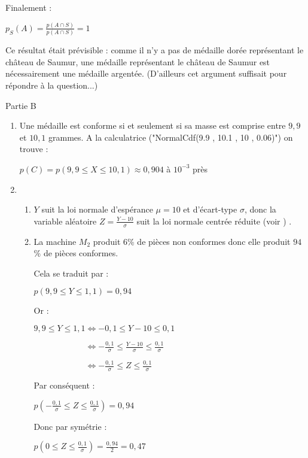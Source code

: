 \begin{corrige}
\begin{enumerate}
          \par
          Finalement :
          \par
          $p_S(A)=\frac{p(A \cap S)}{p(A \cap S)}=1$
          \par
          Ce résultat était prévisible : comme il n'y a pas de médaille dorée représentant le château de Saumur, une médaille représentant le château de Saumur est nécessairement une médaille argentée. (D'ailleurs cet argument suffisait pour répondre à la question...)
     \end{enumerate}
     \begin{h3}Partie B\end{h3}
     \begin{enumerate}
          \item
          Une médaille est conforme si et seulement si sa masse est comprise entre $9,9$ et $10,1$ grammes. A la calculatrice ("NormalCdf(9.9 , 10.1 , 10 , 0.06)") on trouve :
          \par
          $p(C)=p(9,9 \leqslant X \leqslant 10,1) \approx 0,904$ à $10^{-3}$ près
          \item
          \begin{enumerate}
               \item
               $Y$ suit la loi normale d'espérance $\mu = 10$ et d'écart-type $\sigma$, donc la variable aléatoire $Z=\frac{Y-10}{\sigma}$ suit la loi normale centrée réduite (voir ) .
               \item
               La machine $M_2$ produit $6$\% de pièces non conformes donc elle produit $94$\% de pièces conformes.
               \par
               Cela se traduit par :
               \par
               $p(9,9 \leqslant Y \leqslant 1,1)=0,94$
               \par
               Or :
               \par
               $9,9 \leqslant Y \leqslant 1,1 \Leftrightarrow -0,1 \leqslant Y-10 \leqslant 0,1 $
               \par
               $\phantom{9,9 \leqslant Y \leqslant 1,1 }\Leftrightarrow -\frac{0,1}{\sigma} \leqslant \frac{Y-10}{\sigma} \leqslant \frac{0,1}{\sigma} $
               \par
               $\phantom{9,9 \leqslant Y \leqslant 1,1 }\Leftrightarrow -\frac{0,1}{\sigma} \leqslant Z \leqslant \frac{0,1}{\sigma} $
               \par
               Par conséquent :
               \par
               $p\left(-\frac{0,1}{\sigma} \leqslant Z \leqslant \frac{0,1}{\sigma}\right) =0,94$
               \par
               Donc par symétrie :
               \par
               $p\left(0 \leqslant Z \leqslant \frac{0,1}{\sigma}\right) =\frac{0,94}{2}=0,47$


\end{enumerate}
\end{enumerate}
\end{corrige}
